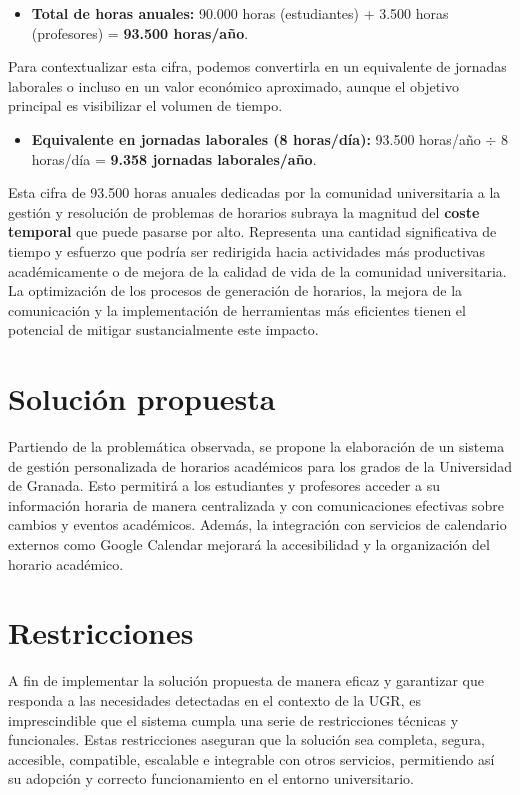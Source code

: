 \begin{itemize}
    \item \textbf{Total de horas anuales:} 90.000 horas (estudiantes) + 3.500 horas (profesores) = \textbf{93.500 horas/año}.
\end{itemize}

Para contextualizar esta cifra, podemos convertirla en un equivalente de jornadas laborales o incluso en un valor económico aproximado, aunque el objetivo principal es visibilizar el volumen de tiempo.

\begin{itemize}
    \item \textbf{Equivalente en jornadas laborales (8 horas/día):} 93.500 horas/año $\div$ 8 horas/día = \textbf{9.358 jornadas laborales/año}.
\end{itemize}

Esta cifra de 93.500 horas anuales dedicadas por la comunidad universitaria a la gestión y resolución de problemas de horarios subraya la magnitud del \textbf{coste temporal} que puede pasarse por alto. Representa una cantidad significativa de tiempo y esfuerzo que podría ser redirigida hacia actividades más productivas académicamente o de mejora de la calidad de vida de la comunidad universitaria. La optimización de los procesos de generación de horarios, la mejora de la comunicación y la implementación de herramientas más eficientes tienen el potencial de mitigar sustancialmente este impacto.

\section{Solución propuesta}

Partiendo de la problemática observada, se propone la elaboración de un sistema de gestión personalizada de horarios académicos para los grados de la Universidad de Granada. 
Esto permitirá a los estudiantes y profesores acceder a su información horaria de manera centralizada y con comunicaciones efectivas sobre cambios y eventos académicos. Además, la integración con servicios de calendario externos como Google Calendar mejorará la accesibilidad y la organización del horario académico.

\section{Restricciones}

A fin de implementar la solución propuesta de manera eficaz y garantizar que responda a las necesidades detectadas en el contexto de la UGR, es imprescindible que el sistema cumpla una serie de restricciones técnicas y funcionales. Estas restricciones aseguran que la solución sea completa, segura, accesible, compatible, escalable e integrable con otros servicios, permitiendo así su adopción y correcto funcionamiento en el entorno universitario.

